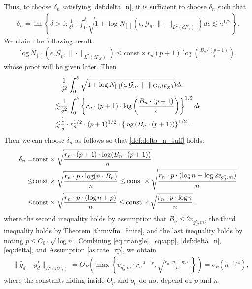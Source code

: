 \documentclass[11pt]{article}
\numberwithin{equation}{section}
\begin{document}
Thus, to choose $\delta_n$ satisfying \eqref{def:delta_n}, it is sufficient to choose $\delta_n$ such that
\begin{align} \label{def:delta_n_suff}
	\delta_n=\inf \left\{ \delta>0:\frac{1}{\delta^{2}}\cdot \int_0^{\delta}\sqrt{1+\log N_{[\ ]}(\epsilon,{\mathcal{G}}_{n},\|\cdot\|_{L^2(dF_{X})})}d\epsilon\lesssim n^{1/2} \right\}.
\end{align}
We claim the following result:
\begin{align}\label{eq:Hbound1}
	\log N_{[\ ]}(\epsilon,\mathcal{G}_n,\|\cdot\|_{L^2(dF_X)})\leq \text{const}\times r_n(p+1)\log \left(\frac{B_n\cdot(p+1)}{\epsilon}\right),
\end{align}
whose proof will be given later. Then
\begin{align}
	&\frac{1}{\delta^2}\int_0^{\delta}\sqrt{1+\log N_{[\ ]}(\epsilon,{\mathcal{G}}_{n},\|\cdot\|_{L^2(dF_{X})})}d\epsilon \notag \\
	\lesssim&\frac{1}{\delta^2}\int_{0}^{\delta}	\left\{r_n\cdot (p+1)\cdot \log \left(\frac{ B_n\cdot (p+1)}{\epsilon}\right)\right\}^{1/2}d\epsilon\notag\\
	\lesssim &\frac{1}{\delta}\cdot r_n^{1/2}\cdot  (p+1)^{1/2}\cdot  \left\{  \log \left(  B_n\cdot (p+1)\right)\right\}^{1/2}. \label{eq:Hbound2}
\end{align}
Then we can choose $\delta_n$  as follows  so that  \eqref{def:delta_n_suff} holds:
\begin{align}
	\delta_n =&\text{const}\times\sqrt{\frac{ r_n\cdot (p+1)\cdot \log(B_n\cdot (p+1))}{n}} \notag\\
	\leq & \text{const}\times \sqrt{\frac{r_n\cdot p\cdot \log (n\cdot B_n)}{n}}\leq  \text{const}\times \sqrt{\frac{ r_n\cdot p\cdot (\log n+\log 2v_{g_d^*,m} )}{n}} \notag\\
	\leq & \text{const}\times \sqrt{\frac{ r_n\cdot p\cdot (\log n+p )}{n}}\leq \text{const}\times \sqrt{\frac{ r_n\cdot p\cdot \log n }{n}},\label{eq:delta}
\end{align}
where the second inequality holds by assumption that $B_n\leq 2v_{g_d^*,m}$,  the third inequality holds by Theorem \ref{thm:vfm_finite}, and the last inequality holds by noting $p\leq C_0\cdot \sqrt{\log n}$. Combining \eqref{eq:triangle}, \eqref{eq:app}, \eqref{def:delta_n}, \eqref{eq:delta}, and Assumption \ref{as:rate_rp}, we obtain
\begin{align*}
	&\|\widehat{g}_d-g_d^*\|_{L^2(dF_X)}=O_P\left(\max\left\{v_{g_d^*,m}\cdot r_n^{-\frac{1}{2}-\frac{1}{p}},\sqrt{\frac{r_n\cdot p\cdot \log n}{n}}\right\}\right)=o_P(n^{-1/4}),
\end{align*}
where the constants hiding inside $O_p$ and $o_p$ do not depend on
$p$ and $n$.
\end{document}
